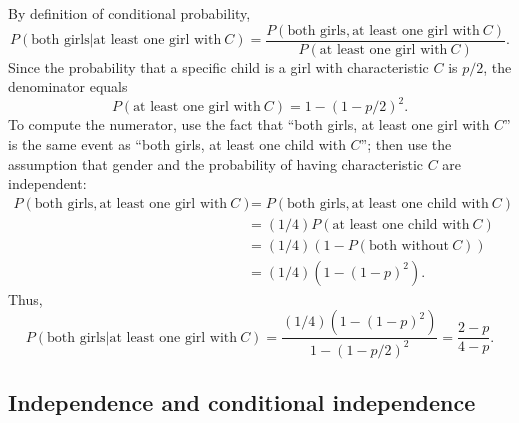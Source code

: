 {\begin{solution}
        By definition of conditional probability, 
        \begin{equation*}
            P(\text{both girls}|\text{at least one girl with} \ C) = \frac{P(\text{both girls}, \text{at least one girl with} \ C)}{P(\text{at least one girl with} \ C)}. 
        \end{equation*}
        Since the probability that a specific child is a girl with characteristic $C$ is $p/2$, the denominator equals 
        \begin{equation*}
            P(\text{at least one girl with} \ C) = 1 - (1 - p/2)^2. 
        \end{equation*}
        To compute the numerator, use the fact that ``both girls, at least one girl with $C$'' is the same event as ``both girls, at least one child with $C$''; then use the assumption that gender and the probability of having characteristic $C$ are independent: 
        \begin{equation*}
            \begin{aligned}
                P(\text{both girls}, \text{at least one girl with} \ C) 
                &= P(\text{both girls}, \text{at least one child with} \ C) \\
                &= (1/4)P(\text{at least one child with} \ C) \\
                &= (1/4)(1 - P(\text{both without} \ C)) \\
                &= (1/4)(1 - (1 - p)^2). 
            \end{aligned}
        \end{equation*}
        Thus, 
        \begin{equation*}
            P(\text{both girls}|\text{at least one girl with} \ C) = \frac{(1/4)(1 - (1 - p)^2)}{1 - (1 - p/2)^2} = \frac{2-p}{4-p}. 
        \end{equation*}
    \end{solution}
    \subsection{Independence and conditional independence}
    \item %
    \item %
    \item %
    \item %
    \item %
    \item %
    \item %
    \item %
    \item %
    \leavevmode
}
